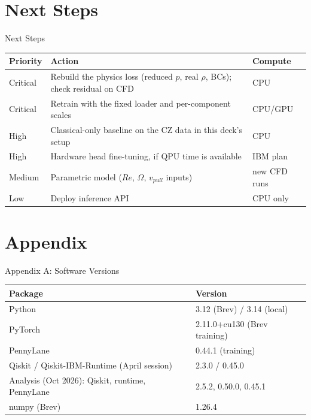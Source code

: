 \documentclass[aspectratio=169]{beamer}
\begin{document}
\section{Next Steps}

\begin{frame}{Next Steps}
\begin{table}
\centering
\small
\begin{tabular}{lll}
\toprule
Priority & Action & Compute \\
\midrule
Critical & Rebuild the physics loss (reduced $p$, real $\rho$, BCs); check residual on CFD & CPU \\
Critical & Retrain with the fixed loader and per-component scales & CPU/GPU \\
High & Classical-only baseline on the CZ data in this deck's setup & CPU \\
High & Hardware head fine-tuning, if QPU time is available & IBM plan \\
Medium & Parametric model ($Re$, $\Omega$, $v_{pull}$ inputs) & new CFD runs \\
Low & Deploy inference API & CPU only \\
\bottomrule
\end{tabular}
\end{table}
\end{frame}

\section{Appendix}

\begin{frame}{Appendix A: Software Versions}
\begin{table}
\centering
\small
\begin{tabular}{ll}
\toprule
Package & Version \\
\midrule
Python & 3.12 (Brev) / 3.14 (local) \\
PyTorch & 2.11.0+cu130 (Brev training) \\
PennyLane & 0.44.1 (training) \\
Qiskit / Qiskit-IBM-Runtime (April session) & 2.3.0 / 0.45.0 \\
Analysis (Oct 2026): Qiskit, runtime, PennyLane & 2.5.2, 0.50.0, 0.45.1 \\
numpy (Brev) & 1.26.4 \\
\bottomrule
\end{tabular}
\end{table}
\end{frame}
\end{document}
